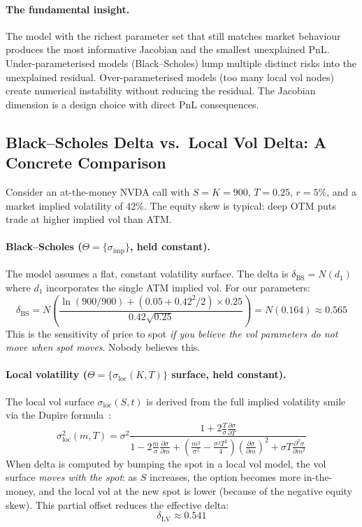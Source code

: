 \documentclass[11pt,a4paper]{article}
\begin{document}
\paragraph{The fundamental insight.}  The model with the richest parameter set that still matches market behaviour produces the most informative Jacobian and the smallest unexplained PnL.  Under-parameterised models (Black--Scholes) lump multiple distinct risks into the unexplained residual.  Over-parameterised models (too many local vol nodes) create numerical instability without reducing the residual.  The Jacobian dimension is a design choice with direct PnL consequences.

\subsection{Black--Scholes Delta vs.\ Local Vol Delta: A Concrete Comparison}
\label{sec:bs-vs-lv}

Consider an at-the-money NVDA call with $S = K = 900$, $T = 0.25$, $r = 5\%$, and a market implied volatility of 42\%.  The equity skew is typical: deep OTM puts trade at higher implied vol than ATM.

\paragraph{Black--Scholes ($\Theta = \{\sigma_{\mathrm{imp}}\}$, held constant).}  The model assumes a flat, constant volatility surface.  The delta is $\delta_{\mathrm{BS}} = N(d_1)$ where $d_1$ incorporates the single ATM implied vol.  For our parameters:
\[
\delta_{\mathrm{BS}} = N\!\left(\frac{\ln(900/900) + (0.05 + 0.42^2/2) \times 0.25}{0.42\sqrt{0.25}}\right) = N(0.164) \approx 0.565
\]
This is the sensitivity of price to spot \emph{if you believe the vol parameters do not move when spot moves}.  Nobody believes this.

\paragraph{Local volatility ($\Theta = \{\sigma_{\mathrm{loc}}(K,T)\}$ surface, held constant).}  The local vol surface $\sigma_{\mathrm{loc}}(S, t)$ is derived from the full implied volatility smile via the Dupire formula~\cite{loc_vol,implied_local_vol}:
\[
\sigma_{\mathrm{loc}}^2(m, T) = \sigma^2 \frac{1 + 2\frac{T}{\sigma}\frac{\partial \sigma}{\partial T}}{1 - 2\frac{m}{\sigma}\frac{\partial \sigma}{\partial m} + \left(\frac{m^2}{\sigma^2} - \frac{\sigma^2 T^2}{4}\right)\left(\frac{\partial \sigma}{\partial m}\right)^2 + \sigma T \frac{\partial^2 \sigma}{\partial m^2}}
\]
When delta is computed by bumping the spot in a local vol model, the vol surface \emph{moves with the spot}: as $S$ increases, the option becomes more in-the-money, and the local vol at the new spot is lower (because of the negative equity skew).  This partial offset reduces the effective delta:
\[
\delta_{\mathrm{LV}} \approx 0.541
\]
\end{document}
